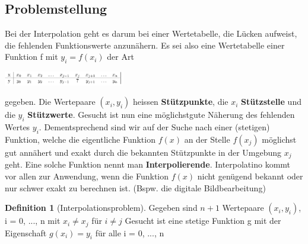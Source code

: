 \documentclass{article}
\newenvironment{Figure}
	{\par\medskip\noindent\minipage{\linewidth}}
	{\endminipage\par\medskip}
\theoremstyle{satz}
\theoremstyle{definition}
\newtheorem{definition}{Definition}
\begin{document}
\subsection{Problemstellung}
Bei der Interpolation geht es darum bei einer Wertetabelle, die Lücken aufweist, die fehlenden Funktionswerte anzunähern. Es sei also eine Wertetabelle einer Funktion f mit $y_i = f(x_i)$ der Art
\begin{Figure}
\centering
\includegraphics[width=200px]{img/WertetabelleInterpolation.png}
	\label{fig:Allgemeine Wertetabelle Interpolation}
\end{Figure}
gegeben. Die Wertepaare $(x_i, y_i)$ heissen \textbf{Stützpunkte}, die $x_i$ \textbf{Stützstelle} und die $y_i$ \textbf{Stützwerte}. Gesucht ist nun eine möglichstgute Näherung des fehlenden Wertes $y_i$. Dementsprechend sind wir auf der Suche nach einer (stetigen) Funktion, welche die eigentliche Funktion $f(x)$ an der Stelle $f(x_j)$ möglichst gut annähert und exakt durch die bekannten Stützpunkte in der Umgebung $x_j$ geht. Eine solche Funktion nennt man \textbf{Interpolierende}. Interpolatino kommt vor allen zur Anwendung, wenn die Funktion $f(x)$ nicht genügend bekannt oder nur schwer exakt zu berechnen ist. (Bspw. die digitale Bildbearbeitung)

\theoremstyle{definition}
\begin{tcolorbox}
\begin{definition}[Interpolationsproblem]
Gegeben sind $n+1$ Wertepaare $(x_i, y_i)$, i = 0, ..., n mit $x_i \neq x_j$ für  $i \neq j$ Gesucht ist eine stetige Funktion g mit der Eigenschaft $g(x_i) = y_i$ für alle i = 0, ..., n 
\end{definition}
\end{tcolorbox}
\end{document}
